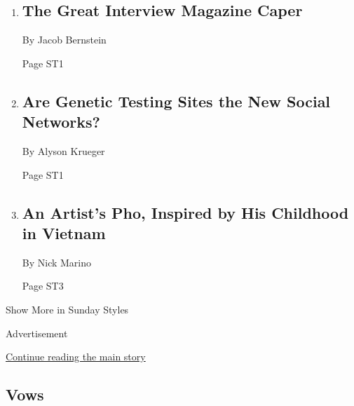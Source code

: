 \begin{enumerate}
\def\labelenumi{\arabic{enumi}.}
\item
  \href{/2018/06/16/style/andy-warhol-interview.html}{}

  \hypertarget{the-great-interview-magazine-caper-1}{%
  \subsection{The Great Interview Magazine
  Caper}\label{the-great-interview-magazine-caper-1}}

  By Jacob Bernstein

  Page ST1
\item
  \href{/2018/06/16/style/23-and-me-ancestry-dna.html}{}

  \hypertarget{are-genetic-testing-sites-the-new-social-networks}{%
  \subsection{Are Genetic Testing Sites the New Social
  Networks?}\label{are-genetic-testing-sites-the-new-social-networks}}

  By Alyson Krueger

  Page ST1
\item
  \href{/2018/06/12/t-magazine/danh-vo-pho-recipe.html}{}

  \hypertarget{an-artists-pho-inspired-by-his-childhood-in-vietnam}{%
  \subsection{An Artist's Pho, Inspired by His Childhood in
  Vietnam}\label{an-artists-pho-inspired-by-his-childhood-in-vietnam}}

  By Nick Marino

  Page ST3
\end{enumerate}

Show More in Sunday Styles

Advertisement

\protect\hyperlink{after-mid7}{Continue reading the main story}

\hypertarget{vows}{%
\subsection{Vows}\label{vows}}

